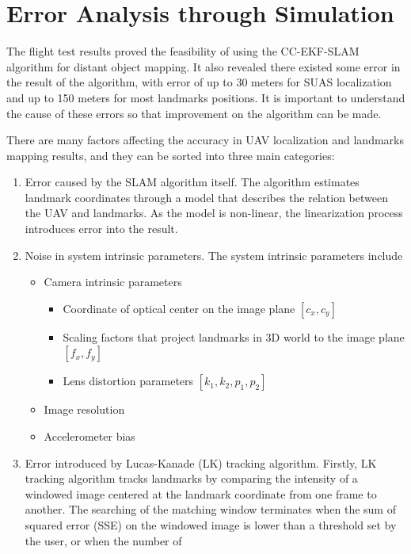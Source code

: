 \chapter{Error Analysis through Simulation}\label{ch:simulation}
The flight test results proved the feasibility of using the CC-EKF-SLAM
algorithm for distant object mapping. It also revealed there existed
some error in the result of the algorithm, with error of up to 30
meters for SUAS localization and up to 150 meters for most landmarks
positions. It is important to understand the cause of these errors so
that improvement on the algorithm can be made.

There are many factors affecting the accuracy in UAV localization and
landmarks mapping results, and they can be sorted into three main
categories:

\begin{enumerate}
  \item Error caused by the SLAM algorithm itself. The algorithm
  estimates landmark coordinates through a model that describes the
  relation between the UAV and landmarks. As the model is non-linear,
  the linearization process introduces error into the result.
  \item Noise in system intrinsic parameters. The system intrinsic
  parameters include
  \begin{itemize}
    \item Camera intrinsic parameters
    \begin{itemize}
      \item Coordinate of optical center on the image plane $[c_{x}, c_{y}]$
      \item Scaling factors that project landmarks in 3D world to the image plane $ [f_{x}, f_{y}]$
      \item Lens distortion parameters $[k_{1}, k_{2}, p_{1}, p_{2}]$
    \end{itemize}
    \item Image resolution
    \item Accelerometer bias %
  \end{itemize}
  \item Error introduced by Lucas-Kanade (LK) tracking algorithm.
  Firstly, LK tracking algorithm tracks landmarks by comparing the
  intensity of a windowed image centered at the landmark coordinate
  from one frame to another. The searching of the matching window
  terminates when the sum of squared error (SSE) on the windowed image
  is lower than a threshold set by the user, or when the number of

\end{enumerate}

